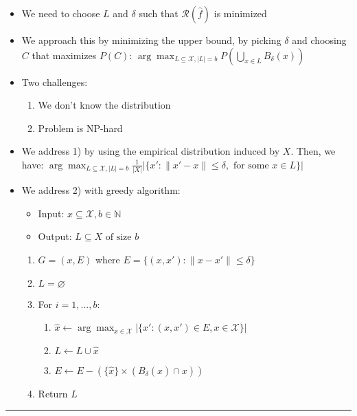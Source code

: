 \begin{itemize}
    \item We need to choose $L$ and $\delta$ such that $\mathcal{R}(\hat{f})$ is minimized
    \item We approach this by minimizing the upper bound, by picking $\delta$ and choosing $C$ that maximizes $P(C)$:
    $\arg\max_{L \subseteq \mathcal{X}, |L| = b} P(\bigcup_{x \in L} B_\delta(x))$
    \item Two challenges:
    \begin{enumerate}
        \item We don't know the distribution
        \item Problem is NP-hard
    \end{enumerate}
    \item We address 1) by using the empirical distribution induced by $X$. Then, we have: $\arg\max_{L \subseteq \mathcal{X}, |L| = b} \frac{1}{|X|} | \{ x': \|x'-x\| \leq \delta, \textrm{ for some } x \in L \} |$
    \item We address 2) with greedy algorithm:
    \begin{itemize}
        \item Input: $x \subseteq \mathcal{X}, b \in \mathbb{N}$
        \item Output: $L \subseteq X \textrm{ of size } b$
    \end{itemize}
    \begin{enumerate}
        \item $G = (x,E)$ where $E = \{ (x,x') : \| x - x' \| \leq \delta \}$
        \item $L = \varnothing$
        \item For $i = 1, ..., b$:
        \begin{enumerate}
            \item $\hat{x} \leftarrow \arg\max_{x \in \mathcal{X}} | \{ x': (x,x') \in E, x \in \mathcal{X} \} |$
            \item $L \leftarrow L \cup {\hat{x}}$
            \item $E \leftarrow E - (\{ \hat{x} \} \times (B_\delta(\hat{x}) \cap x))$
        \end{enumerate}
        \item Return $L$
    \end{enumerate}
\end{itemize}

{\color{lightgray}\hrule height 0.001mm}

